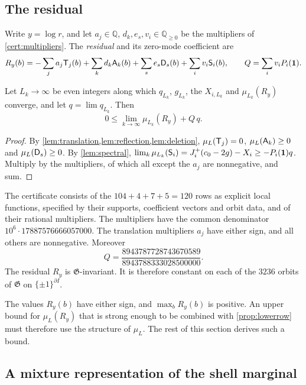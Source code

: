 \subsection{The residual}\label{sec:residual}

Write $y=\log r$, and let $a_j\in\mathbb Q$, $d_k,e_s,v_i\in\mathbb Q_{\ge0}$ be the multipliers of \cref{cert:multipliers}. The \emph{residual} and its zero-mode coefficient are
\begin{equation}\label{eq:residual}
 R_y(b)=-\sum_ja_j\mathsf T_j(b)+\sum_kd_k\mathsf A_k(b)+\sum_se_s\mathsf D_s(b)+\sum_iv_i\mathsf S_i(b),\qquad
 Q=\sum_iv_iP_i(\mathbf 1).
\end{equation}

\begin{proposition}\label{prop:lowerrow}
Let $L_k\to\infty$ be even integers along which $q_{L_k}$, $g_{L_k}$, the $X_{i,L_k}$ and $\mu_{L_k}(R_y)$ converge, and let $q=\lim q_{L_k}$. Then
\[
 0\le\lim_{k\to\infty}\mu_{L_k}(R_y)+Q\,q .
\]
\end{proposition}

\begin{proof}
By \cref{lem:translation,lem:reflection,lem:deletion}, $\mu_L(\mathsf T_j)=0$, $\mu_L(\mathsf A_k)\ge0$ and $\mu_L(\mathsf D_s)\ge0$. By \cref{lem:spectral}, $\lim_k\mu_{L_k}(\mathsf S_i)=J_i^+(c_0-2g)-X_i\ge-P_i(\mathbf 1)q$. Multiply by the multipliers, of which all except the $a_j$ are nonnegative, and sum.
\end{proof}

\begin{certificate}\label{cert:multipliers}
The certificate consists of the $104+4+7+5=120$ rows as explicit local functions, specified by their supports, coefficient vectors and orbit data, and of their rational multipliers. The multipliers have the common denominator $10^6\cdot17887576666057000$. The translation multipliers $a_j$ have either sign, and all others are nonnegative. Moreover
\[
 Q=\frac{8943787728743670589}{8943788333028500000}.
\]
The residual $R_y$ is $\mathfrak G$-invariant. It is therefore constant on each of the $3236$ orbits of $\mathfrak G$ on $\{\pm1\}^{\partial I}$.
\end{certificate}

The values $R_y(b)$ have either sign, and $\max_bR_y(b)$ is positive. An upper bound for $\mu_L(R_y)$ that is strong enough to be combined with \cref{prop:lowerrow} must therefore use the structure of $\mu_L$. The rest of this section derives such a bound.

\subsection{A mixture representation of the shell marginal}\label{sec:mixture}

